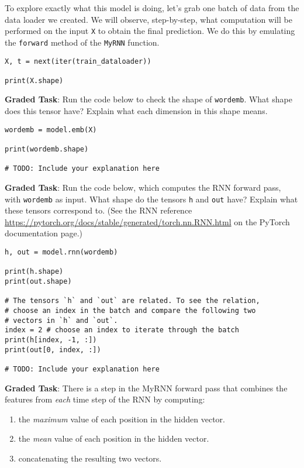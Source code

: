 \documentclass[
  letterpaper,
  DIV=11,
  numbers=noendperiod]{scrartcl}
\providecommand{\tightlist}{%
  \setlength{\itemsep}{0pt}\setlength{\parskip}{0pt}}
\begin{document}
To explore exactly what this model is doing, let's grab one batch of
data from the data loader we created. We will observe, step-by-step,
what computation will be performed on the input \texttt{X} to obtain the
final prediction. We do this by emulating the \texttt{forward} method of
the \texttt{MyRNN} function.

\begin{verbatim}
X, t = next(iter(train_dataloader))

print(X.shape)
\end{verbatim}

\textbf{Graded Task}: Run the code below to check the shape of
\texttt{wordemb}. What shape does this tensor have? Explain what each
dimension in this shape means.

\begin{verbatim}
wordemb = model.emb(X)

print(wordemb.shape)

# TODO: Include your explanation here
\end{verbatim}

\textbf{Graded Task}: Run the code below, which computes the RNN forward
pass, with \texttt{wordemb} as input. What shape do the tensors
\texttt{h} and \texttt{out} have? Explain what these tensors correspond
to. (See the RNN reference
\url{https://pytorch.org/docs/stable/generated/torch.nn.RNN.html} on the
PyTorch documentation page.)

\begin{verbatim}
h, out = model.rnn(wordemb)

print(h.shape)
print(out.shape)

# The tensors `h` and `out` are related. To see the relation,
# choose an index in the batch and compare the following two
# vectors in `h` and `out`.
index = 2 # choose an index to iterate through the batch
print(h[index, -1, :])
print(out[0, index, :])

# TODO: Include your explanation here
\end{verbatim}

\textbf{Graded Task}: There is a step in the MyRNN forward pass that
combines the features from \emph{each} time step of the RNN by
computing:

\begin{enumerate}
\def\labelenumi{\arabic{enumi}.}
\tightlist
\item
  the \emph{maximum} value of each position in the hidden vector.
\item
  the \emph{mean} value of each position in the hidden vector.
\item
  concatenating the resulting two vectors.
\end{enumerate}
\end{document}
